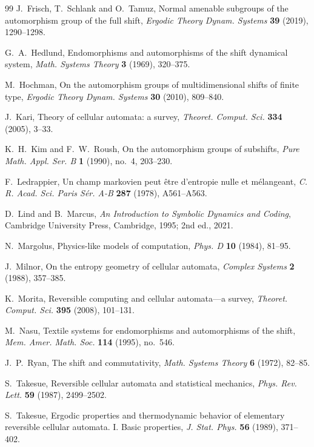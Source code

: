 \documentclass[11pt]{amsart}
\theoremstyle{definition}
\theoremstyle{remark}
\theoremstyle{plain}
\begin{document}
\begin{thebibliography}{99}
 J.~Frisch, T.~Schlank and O.~Tamuz, Normal amenable subgroups of the automorphism group of the full shift, \emph{Ergodic Theory Dynam. Systems} \textbf{39} (2019), 1290--1298.

 G.~A.~Hedlund, Endomorphisms and automorphisms of the shift dynamical system, \emph{Math. Systems Theory} \textbf{3} (1969), 320--375.

 M.~Hochman, On the automorphism groups of multidimensional shifts of finite type, \emph{Ergodic Theory Dynam. Systems} \textbf{30} (2010), 809--840.

 J.~Kari, Theory of cellular automata: a survey, \emph{Theoret. Comput. Sci.} \textbf{334} (2005), 3--33.

 K.~H.~Kim and F.~W.~Roush, On the automorphism groups of subshifts, \emph{Pure Math. Appl. Ser. B} \textbf{1} (1990), no.~4, 203--230.

 F.~Ledrappier, Un champ markovien peut \^etre d'entropie nulle et m\'elangeant, \emph{C. R. Acad. Sci. Paris S\'er. A-B} \textbf{287} (1978), A561--A563.

 D.~Lind and B.~Marcus, \emph{An Introduction to Symbolic Dynamics and Coding}, Cambridge University Press, Cambridge, 1995; 2nd ed., 2021.

 N.~Margolus, Physics-like models of computation, \emph{Phys. D} \textbf{10} (1984), 81--95.

 J.~Milnor, On the entropy geometry of cellular automata, \emph{Complex Systems} \textbf{2} (1988), 357--385.

 K.~Morita, Reversible computing and cellular automata---a survey, \emph{Theoret. Comput. Sci.} \textbf{395} (2008), 101--131.

 M.~Nasu, Textile systems for endomorphisms and automorphisms of the shift, \emph{Mem. Amer. Math. Soc.} \textbf{114} (1995), no.~546.

 J.~P.~Ryan, The shift and commutativity, \emph{Math. Systems Theory} \textbf{6} (1972), 82--85.

 S.~Takesue, Reversible cellular automata and statistical mechanics, \emph{Phys. Rev. Lett.} \textbf{59} (1987), 2499--2502.

 S.~Takesue, Ergodic properties and thermodynamic behavior of elementary reversible cellular automata. I. Basic properties, \emph{J. Stat. Phys.} \textbf{56} (1989), 371--402.


\end{thebibliography}
\end{document}
